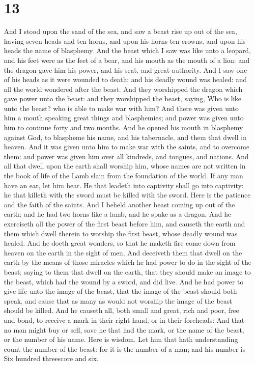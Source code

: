 \hypertarget{section-12}{%
\section{13}\label{section-12}}

 And I stood upon the sand of the sea, and saw a beast rise
up out of the sea, having seven heads and ten horns, and upon his horns
ten crowns, and upon his heads the name of blasphemy.  And
the beast which I saw was like unto a leopard, and his feet were as the
feet of a bear, and his mouth as the mouth of a lion: and the dragon
gave him his power, and his seat, and great authority.  And
I saw one of his heads as it were wounded to death; and his deadly wound
was healed: and all the world wondered after the beast.  And
they worshipped the dragon which gave power unto the beast: and they
worshipped the beast, saying, Who is like unto the beast? who is able to
make war with him?  And there was given unto him a mouth
speaking great things and blasphemies; and power was given unto him to
continue forty and two months.  And he opened his mouth in
blasphemy against God, to blaspheme his name, and his tabernacle, and
them that dwell in heaven.  And it was given unto him to
make war with the saints, and to overcome them: and power was given him
over all kindreds, and tongues, and nations.  And all that
dwell upon the earth shall worship him, whose names are not written in
the book of life of the Lamb slain from the foundation of the world.
 If any man have an ear, let him hear.  He that
leadeth into captivity shall go into captivity: he that killeth with the
sword must be killed with the sword. Here is the patience and the faith
of the saints.  And I beheld another beast coming up out of
the earth; and he had two horns like a lamb, and he spake as a dragon.
 And he exerciseth all the power of the first beast before
him, and causeth the earth and them which dwell therein to worship the
first beast, whose deadly wound was healed.  And he doeth
great wonders, so that he maketh fire come down from heaven on the earth
in the sight of men,  And deceiveth them that dwell on the
earth by the means of those miracles which he had power to do in the
sight of the beast; saying to them that dwell on the earth, that they
should make an image to the beast, which had the wound by a sword, and
did live.  And he had power to give life unto the image of
the beast, that the image of the beast should both speak, and cause that
as many as would not worship the image of the beast should be killed.
 And he causeth all, both small and great, rich and poor,
free and bond, to receive a mark in their right hand, or in their
foreheads:  And that no man might buy or sell, save he that
had the mark, or the name of the beast, or the number of his name.
 Here is wisdom. Let him that hath understanding count the
number of the beast: for it is the number of a man; and his number is
Six hundred threescore and six.

